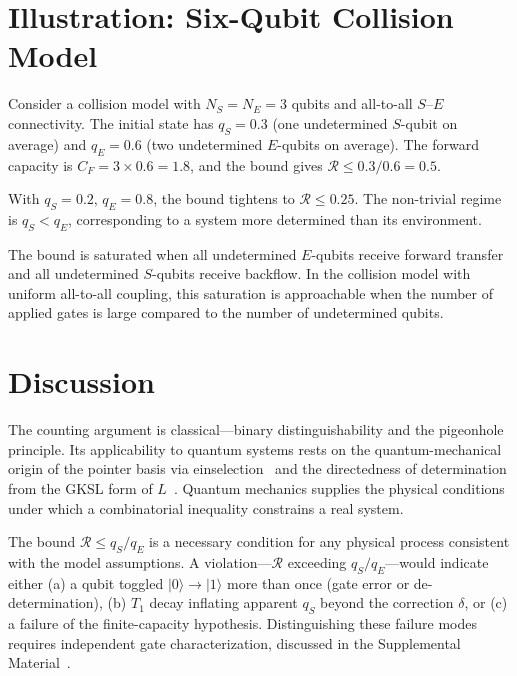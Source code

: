 \documentclass[aps,prl,twocolumn,superscriptaddress,hyperref]{revtex4-2}
\begin{document}
\section{Illustration: Six-Qubit Collision Model}

Consider a collision model with $N_S = N_E = 3$ qubits and all-to-all $S$--$E$ connectivity. The initial state has $q_S = 0.3$ (one undetermined $S$-qubit on average) and $q_E = 0.6$ (two undetermined $E$-qubits on average). The forward capacity is $C_F = 3 \times 0.6 = 1.8$, and the bound gives $\mathcal{R} \leq 0.3/0.6 = 0.5$.

With $q_S = 0.2$, $q_E = 0.8$, the bound tightens to $\mathcal{R} \leq 0.25$. The non-trivial regime is $q_S < q_E$, corresponding to a system more determined than its environment.

The bound is saturated when all undetermined $E$-qubits receive forward transfer and all undetermined $S$-qubits receive backflow. In the collision model with uniform all-to-all coupling, this saturation is approachable when the number of applied gates is large compared to the number of undetermined qubits.

\section{Discussion}

The counting argument is classical---binary distinguishability and the pigeonhole principle. Its applicability to quantum systems rests on the quantum-mechanical origin of the pointer basis via einselection~\cite{Zurek:2003} and the directedness of determination from the GKSL form of $L$~\cite{Lindblad:1976,GKS:1976}. Quantum mechanics supplies the physical conditions under which a combinatorial inequality constrains a real system.

The bound $\mathcal{R} \leq q_S/q_E$ is a necessary condition for any physical process consistent with the model assumptions. A violation---$\mathcal{R}$ exceeding $q_S/q_E$---would indicate either (a) a qubit toggled $|0\rangle \to |1\rangle$ more than once (gate error or de-determination), (b) $T_1$ decay inflating apparent $q_S$ beyond the correction $\delta$, or (c) a failure of the finite-capacity hypothesis. Distinguishing these failure modes requires independent gate characterization, discussed in the Supplemental Material~\cite{SM}.
\end{document}
